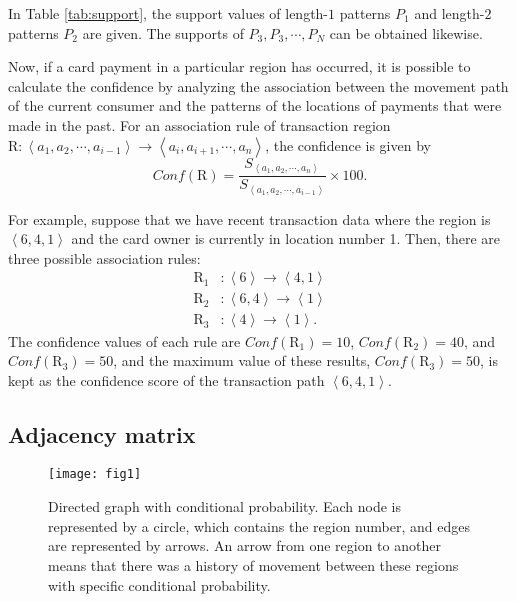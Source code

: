 \documentclass[final,authoryear,5p,times,twocolumn]{elsarticle}
\begin{document}
In Table \ref{tab:support}, the support values of length-$1$ patterns $P_1$ and length-$2$ patterns $P_2$ are given. The supports of $P_3, P_3, \cdots, P_N$ can be obtained likewise.

Now, if a card payment in a particular region has occurred, it is possible to calculate the confidence by analyzing the association between the movement path of the current consumer and the patterns of the locations of payments that were made in the past. For an association rule of transaction region $\mathrm{R}:\left \langle a_1,a_2,\cdots,a_{i-1} \right \rangle\rightarrow \left \langle a_i,a_{i+1},\cdots,a_n \right \rangle$, the confidence is given by
\begin{equation}
Conf(\mathrm{R})=
\frac{S_{\left \langle a_1,a_2,\cdots,a_n \right \rangle}}
{S_{\left \langle a_1,a_2,\cdots,a_{i-1} \right \rangle}}
\times 100.
\end{equation}

For example, suppose that we have recent transaction data where the region is $\left \langle 6,4,1 \right \rangle$ and the card owner is currently in location number 1. Then, there are three possible association rules: 
\begin{align*}
\mathrm{R}_1&:\left \langle 6 \right \rangle\rightarrow \left \langle 4,1 \right \rangle  \\
\mathrm{R}_2&:\left \langle 6,4 \right \rangle\rightarrow \left \langle 1 \right \rangle  \\
\mathrm{R}_3&:\left \langle 4 \right \rangle\rightarrow \left \langle 1 \right \rangle. 
\end{align*}
The confidence values of each rule are $Conf(\mathrm{R}_1)=10$, $Conf(\mathrm{R}_2)=40$, and $Conf(\mathrm{R}_3)=50$, and the maximum value of these results, $Conf(\mathrm{R}_3)=50$, is kept as the confidence score of the transaction path $\left \langle 6,4,1 \right \rangle$.



\subsection{Adjacency matrix}
\label{section:Sec3.5}

\begin{figure}[b!]
\texttt{[image: fig1]}
\caption{Directed graph with conditional probability. Each node is represented by a circle, which contains the region number, and edges are represented by arrows. An arrow from one region to another means that there was a history of movement between these regions with specific conditional probability.}
\label{fig:F1}
\end{figure}
\end{document}
